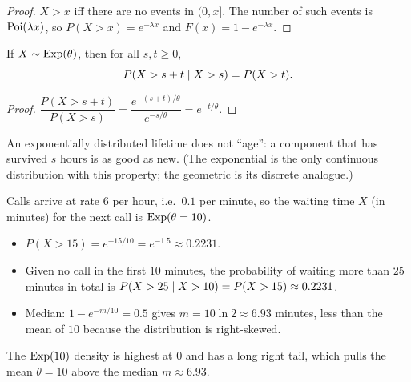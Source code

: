 \begin{proof}
$X > x$ iff there are no events in $(0,x]$. The number of such events is $\operatorname{Poi}(\lambda x)$,
so $P(X > x) = e^{-\lambda x}$ and $F(x) = 1 - e^{-\lambda x}$.
\end{proof}

\begin{theorem}
If $X\sim\operatorname{Exp}(\theta)$, then for all $s,t\ge0$,
\[
  P(X > s + t \mid X > s) = P(X > t).
\]
\end{theorem}

\begin{proof}
$\dfrac{P(X>s+t)}{P(X>s)} = \dfrac{e^{-(s+t)/\theta}}{e^{-s/\theta}} = e^{-t/\theta}$.
\end{proof}

An exponentially distributed lifetime does not ``age'': a component that has survived $s$
hours is as good as new. (The exponential is the only continuous distribution with this
property; the geometric is its discrete analogue.)

\begin{example}
Calls arrive at rate $6$ per hour, i.e.\ $0.1$ per minute, so the waiting time $X$ (in
minutes) for the next call is $\operatorname{Exp}(\theta = 10)$.
\begin{itemize}
  \item $P(X > 15) = e^{-15/10} = e^{-1.5} \approx 0.2231$.
  \item Given no call in the first $10$ minutes, the probability of waiting more than
        $25$ minutes in total is $P(X>25\mid X>10) = P(X > 15) \approx 0.2231$.
  \item Median: $1 - e^{-m/10} = 0.5$ gives $m = 10\ln 2 \approx 6.93$ minutes, less than
        the mean of $10$ because the distribution is right-skewed.
\end{itemize}
\end{example}

\begin{center}
\end{center}
The $\operatorname{Exp}(10)$ density is highest at $0$ and has a long right tail, which pulls the mean
$\theta = 10$ above the median $m \approx 6.93$.

